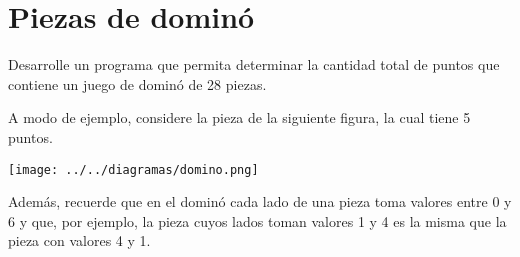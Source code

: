 \section{Piezas de dominó}

Desarrolle un programa que permita determinar la cantidad total de
puntos que contiene un juego de dominó de 28 piezas.

A modo de ejemplo, considere la pieza de la siguiente figura, la cual
tiene 5 puntos.

\texttt{[image: ../../diagramas/domino.png]}

Además, recuerde que en el dominó cada lado de una pieza toma valores
entre 0 y 6 y que, por ejemplo, la pieza cuyos lados toman valores 1 y 4
es la misma que la pieza con valores 4 y 1.
